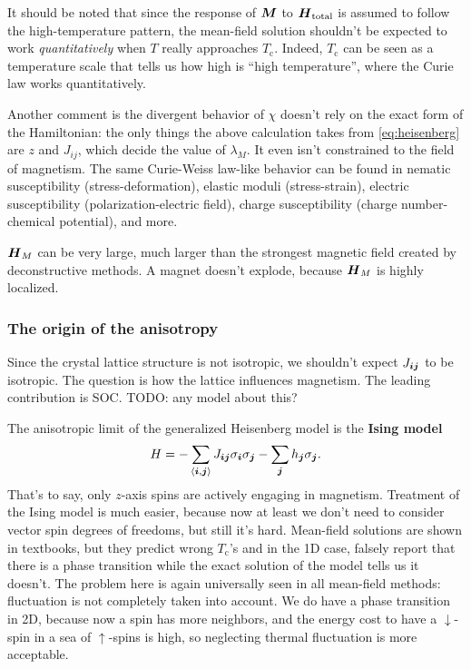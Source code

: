 \documentclass[hyperref, a4paper]{article}
\newcommand*{\pair}[1]{\langle #1 \rangle}
\newcommand*{\concept}[1]{{\textbf{#1}}}
\newcommand*{\Tc}{T_{\text{c}}}
\begin{document}
It should be noted that since the response of $\vb*{M}$ to $\vb*{H}_{\text{total}}$
is assumed to follow the high-temperature pattern,
the mean-field solution shouldn't be expected to work \emph{quantitatively}
when $T$ really approaches $\Tc$.
Indeed, $\Tc$ can be seen as a temperature scale 
that tells us how high is ``high temperature'',
where the Curie law works quantitatively.

Another comment is the divergent behavior of $\chi$ doesn't rely on the 
exact form of the Hamiltonian:
the only things the above calculation takes from \eqref{eq:heisenberg} 
are $z$ and $J_{ij}$, which decide the value of $\lambda_M$.
It even isn't constrained to the field of magnetism.
The same Curie-Weiss law-like behavior can be found 
in nematic susceptibility (stress-deformation),
elastic moduli (stress-strain),
electric susceptibility (polarization-electric field),
charge susceptibility (charge number-chemical potential),
and more.

$\vb*{H}_{M}$ can be very large,
much larger than the strongest magnetic field created 
by deconstructive methods.
A magnet doesn't explode, 
because $\vb*{H}_M$ is highly localized.

\subsubsection{The origin of the anisotropy}

Since the crystal lattice structure is not isotropic, 
we shouldn't expect $J_{\vb*{i} \vb*{j}}$ to be isotropic.
The question is how the lattice influences magnetism.
The leading contribution is SOC. TODO: any model about this?

The anisotropic limit of the generalized Heisenberg model is the \concept{Ising model}
\begin{equation}
    H = - \sum_{\pair{\vb*{i}, \vb*{j}}} J_{\vb*{i} \vb*{j}} \sigma_{\vb*{i}} \sigma_{\vb*{j}}
    - \sum_{\vb*{j}} h_{\vb*{j}} \sigma_{\vb*{j}}.
\end{equation}
That's to say, only $z$-axis spins are actively engaging in magnetism.
Treatment of the Ising model is much easier,
because now at least we don't need to consider vector spin degrees of freedoms,
but still it's hard. 
Mean-field solutions are shown in textbooks, 
but they predict wrong $\Tc$'s 
and in the 1D case, falsely report that there is a phase transition 
while the exact solution of the model tells us 
it doesn't. 
The problem here is again universally seen in all mean-field methods:
fluctuation is not completely taken into account. 
We do have a phase transition in 2D,
because now a spin has more neighbors, 
and the energy cost to have a $\downarrow$-spin 
in a sea of $\uparrow$-spins is high, 
so neglecting thermal fluctuation is more acceptable. 
\end{document}
